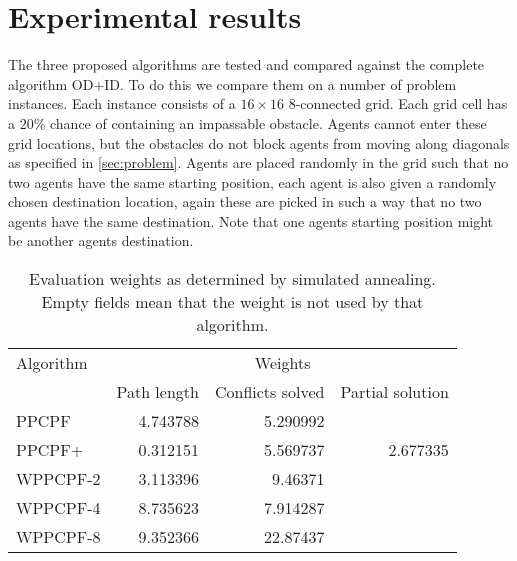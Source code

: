 \section{Experimental results}\label{sec:results}

The three proposed algorithms are tested and compared against the complete
algorithm OD+ID. To do this we compare them on a number of problem instances.
Each instance consists of a $16 \times 16$ 8-connected grid. Each grid cell has
a $20\%$ chance of containing an impassable obstacle. Agents cannot enter these
grid locations, but the obstacles do not block agents from moving along
diagonals as specified in \autoref{sec:problem}. Agents are placed randomly in
the grid such that no two agents have the same starting position, each agent is
also given a randomly chosen destination location, again these are picked in
such a way that no two agents have the same destination. Note that one agents
starting position might be another agents destination.

\begin{table}[t]
	\centering
	\caption{Evaluation weights as determined by simulated annealing. Empty
	fields mean that the weight is not used by that algorithm.}
	\label{tbl:annealing}
	\begin{tabular}{l|r|r|r}
		Algorithm & \multicolumn{3}{c}{Weights} \\ \cline{2-4}
		& Path length & Conflicts solved & Partial solution \\ \hline
		PPCPF     & 4.743788 & 5.290992 &  \\
		PPCPF+    & 0.312151 & 5.569737 & 2.677335 \\
		WPPCPF-2 & 3.113396 & 9.46371 &  \\
		WPPCPF-4 & 8.735623 & 7.914287 &  \\
		WPPCPF-8 & 9.352366 & 22.87437 &
	\end{tabular}
\end{table}

